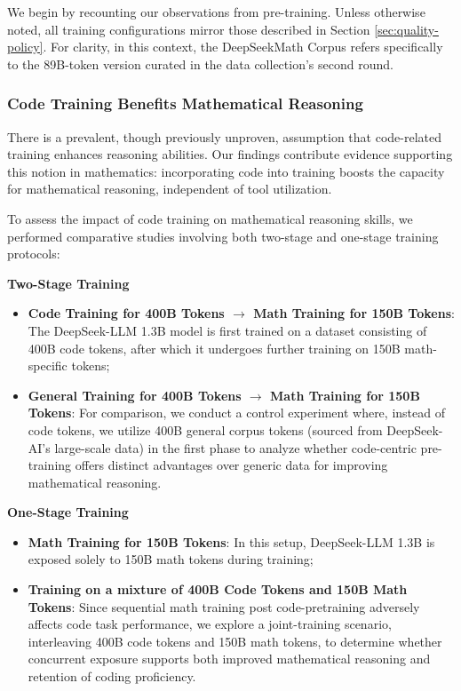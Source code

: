 We begin by recounting our observations from pre-training. Unless otherwise noted, all training configurations mirror those described in Section \ref{sec:quality-policy}. For clarity, in this context, the DeepSeekMath Corpus refers specifically to the 89B-token version curated in the data collection’s second round.

\subsubsection{Code Training Benefits Mathematical Reasoning}

There is a prevalent, though previously unproven, assumption that code-related training enhances reasoning abilities. Our findings contribute evidence supporting this notion in mathematics: incorporating code into training boosts the capacity for mathematical reasoning, independent of tool utilization.

To assess the impact of code training on mathematical reasoning skills, we performed comparative studies involving both two-stage and one-stage training protocols:

\textbf{Two-Stage Training}

\begin{itemize}[topsep=0pt]
    \item \textbf{Code Training for 400B Tokens $\rightarrow$ Math Training for 150B Tokens}: The DeepSeek-LLM 1.3B model is first trained on a dataset consisting of 400B code tokens, after which it undergoes further training on 150B math-specific tokens;
    \item \textbf{General Training for 400B Tokens $\rightarrow$ Math Training for 150B Tokens}: For comparison, we conduct a control experiment where, instead of code tokens, we utilize 400B general corpus tokens (sourced from DeepSeek-AI’s large-scale data) in the first phase to analyze whether code-centric pre-training offers distinct advantages over generic data for improving mathematical reasoning.
\end{itemize}

\textbf{One-Stage Training}

\begin{itemize}[topsep=0pt]
    \item \textbf{Math Training for 150B Tokens}: In this setup, DeepSeek-LLM 1.3B is exposed solely to 150B math tokens during training;
    \item \textbf{Training on a mixture of 400B Code Tokens and 150B Math Tokens}: Since sequential math training post code-pretraining adversely affects code task performance, we explore a joint-training scenario, interleaving 400B code tokens and 150B math tokens, to determine whether concurrent exposure supports both improved mathematical reasoning and retention of coding proficiency.
\end{itemize}

